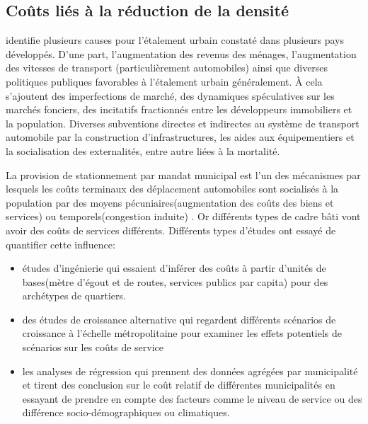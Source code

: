     \subsection{Coûts liés à la réduction de la densité}
    \textcite{ewing_characteristics_2008} identifie plusieurs causes pour l'étalement urbain constaté dans plusieurs pays développés. D'une part, l'augmentation des revenus des ménages, l'augmentation des vitesses de transport (particulièrement automobiles) ainsi que diverses politiques publiques favorables à l'étalement urbain généralement. À cela s'ajoutent des imperfections de marché, des dynamiques spéculatives sur les marchés fonciers, des incitatifs fractionnés entre les développeurs immobiliers et la population. Diverses subventions directes et indirectes au système de transport automobile par la construction d'infrastructures, les aides aux équipementiers et la socialisation des externalités, entre autre liées à la mortalité. \par
    La provision de stationnement par mandat municipal est l'un des mécanismes par lesquels les coûts terminaux des déplacement automobiles sont socialisés à la population par des moyens pécuniaires(augmentation des  coûts des biens et services) ou temporels(congestion induite) \parencite{shoup_high_2005,manville_parking_2005,mccahill_parking_2014}. Or différents types de cadre bâti vont avoir des coûts de services différents. Différents types d'études ont essayé de quantifier cette influence: \begin{itemize}
        \item  études d'ingénierie qui essaient d'inférer des coûts à partir d'unités de bases(mètre d’égout et de routes, services publics par capita) pour des archétypes de quartiers.
        \item des études de croissance alternative qui regardent différents scénarios de croissance à l'échelle métropolitaine pour examiner les effets potentiels de scénarios sur les coûts de service
        \item les analyses de régression qui prennent des données agrégées par municipalité et tirent des conclusion sur le coût relatif de différentes municipalités en essayant de prendre en compte des facteurs comme le niveau de service ou des différence socio-démographiques ou climatiques.
    \end{itemize}
